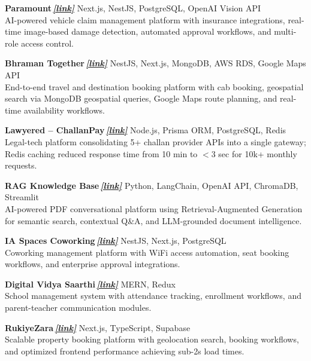 \documentclass[a4paper,9pt]{article}
\newcommand{\projlink}[1]{\,\href{#1}{\normalfont\textbf{\textit{[link]}}}}
\begin{document}
{\footnotesize

\textbf{Paramount}\projlink{https://sage.paramountservices.co.in/}
\hfill Next.js, NestJS, PostgreSQL, OpenAI Vision API \\
AI-powered vehicle claim management platform with insurance integrations, real-time image-based damage detection, automated approval workflows, and multi-role access control.

\vspace{0.3mm}

\textbf{Bhraman Together}\projlink{https://www.bhramantogether.com/}
\hfill NestJS, Next.js, MongoDB, AWS RDS, Google Maps API \\
End-to-end travel and destination booking platform with cab booking, geospatial search via MongoDB geospatial queries, Google Maps route planning, and real-time availability workflows.

\vspace{0.3mm}

\textbf{Lawyered -- ChallanPay}\projlink{https://lawyered.in/}
\hfill Node.js, Prisma ORM, PostgreSQL, Redis \\
Legal-tech platform consolidating 5+ challan provider APIs into a single gateway; Redis caching reduced response time from 10 min to $<$3 sec for 10k+ monthly requests.

\vspace{0.3mm}

\textbf{RAG Knowledge Base}\projlink{https://rag-knowledge-basev2.streamlit.app/}
\hfill Python, LangChain, OpenAI API, ChromaDB, Streamlit \\
AI-powered PDF conversational platform using Retrieval-Augmented Generation for semantic search, contextual Q\&A, and LLM-grounded document intelligence.

\vspace{0.3mm}

\textbf{IA Spaces Coworking}\projlink{https://iaspaces.co/}
\hfill NestJS, Next.js, PostgreSQL \\
Coworking management platform with WiFi access automation, seat booking workflows, and enterprise approval integrations.

\vspace{0.3mm}

\textbf{Digital Vidya Saarthi}\projlink{https://www.digitalvidyasaarthi.in/}
\hfill MERN, Redux \\
School management system with attendance tracking, enrollment workflows, and parent-teacher communication modules.

\vspace{0.3mm}

\textbf{RukiyeZara}\projlink{https://www.rukiyezara.com/}
\hfill Next.js, TypeScript, Supabase \\
Scalable property booking platform with geolocation search, booking workflows, and optimized frontend performance achieving sub-2s load times.

}
\end{document}
